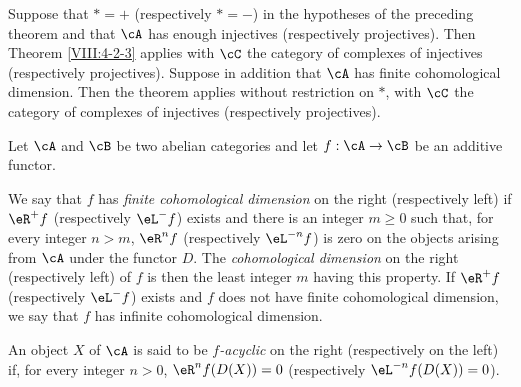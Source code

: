 \documentclass[oneside]{book}
\begin{document}
\begin{corollary}\label{VIII:4-2-3-1} %
Suppose that $\ast=+$ (respectively $\ast=-$) in the hypotheses of the
preceding theorem and that $\cA$ has enough injectives (respectively
projectives). Then Theorem \ref{VIII:4-2-3} applies with $\cC$ the
category of complexes of injectives (respectively projectives). Suppose
in addition that $\cA$ has finite cohomological dimension. Then the
theorem applies without restriction on $\ast$, with $\cC$ the category
of complexes of injectives (respectively projectives).
\end{corollary}

\begin{definition}\label{VIII:4-2-5} %
Let $\cA$ and $\cB$ be two abelian categories and let $f:\cA\to \cB$ be
an additive functor.

We say that $f$ has \emph{finite cohomological dimension} on the right
(respectively left) if $\eR^+ f$ (respectively $\eL^- f$)
exists and there is an integer $m\geqslant 0$ such that, for every integer
$n>m$, $\eR^n f$ (respectively $\eL^{-n} f$) is zero on the objects
arising from $\cA$ under the functor $D$. The
\emph{cohomological dimension} on the right (respectively left) of $f$ is then the
least integer $m$ having this property. If $\eR^+ f$ (respectively
$\eL^- f$) exists and $f$ does not have finite cohomological dimension,
we say that $f$ has infinite cohomological dimension.

An object $X$ of $\cA$ is said to be \emph{$f$-acyclic} on the right
(respectively on the left) if, for every integer $n>0$,
$\eR^n f(D(X)) = 0$ (respectively $\eL^{-n} f(D(X))=0$).
\end{definition}
\end{document}
